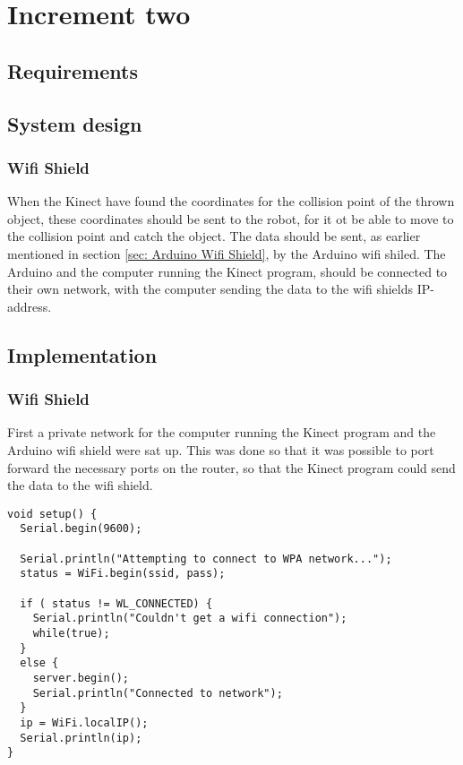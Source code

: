 \chapter{Increment two}
\label{chap:Increment two}

\section{Requirements}
\label{sec:i2Requirements}

\section{System design}
\label{sec:i2System design}

\subsection{Wifi Shield}
\label{sec:Wifi Shield SD}
When the Kinect have found the coordinates for the collision point of the thrown object, these coordinates should be sent to the robot, for it ot be able to move to the collision point and catch the object. 
The data should be sent, as earlier mentioned in section \ref{sec: Arduino Wifi Shield}, by the Arduino wifi shiled. The Arduino and the computer running the Kinect program, should be connected to their own network, with the computer sending the data to the wifi shields IP-address.

\section{Implementation}
\label{sec:i2Implementation}

\subsection{Wifi Shield}
\label{sec:Wifi Shield Implementation}
First a private network for the computer running the Kinect program and the Arduino wifi shield were sat up. This was done so that it was possible to port forward the necessary ports on the router, so that the Kinect program could send the data to the wifi shield.

\begin{lstlisting}[caption={Connecting the Wifi shield to the network} label={ws}]
void setup() {
  Serial.begin(9600);

  Serial.println("Attempting to connect to WPA network...");
  status = WiFi.begin(ssid, pass);

  if ( status != WL_CONNECTED) { 
    Serial.println("Couldn't get a wifi connection");
    while(true);
  } 
  else {
    server.begin();
    Serial.println("Connected to network");
  }
  ip = WiFi.localIP();
  Serial.println(ip);
}
\end{lstlisting}

